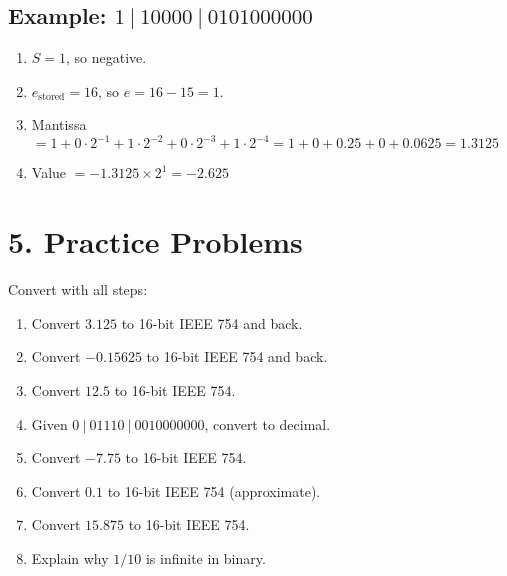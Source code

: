 \documentclass[12pt]{article}
\begin{document}
\subsection*{Example: $1\ |\ 10000\ |\ 0101000000$}
\begin{enumerate}
  \item $S=1$, so negative.
  \item $e_{\text{stored}} = 16$, so $e = 16 - 15 = 1$.
  \item Mantissa $= 1 + 0 \cdot 2^{-1} + 1 \cdot 2^{-2} + 0 \cdot 2^{-3} + 1 \cdot 2^{-4} = 1 + 0 + 0.25 + 0 + 0.0625 = 1.3125$
  \item Value $= -1.3125 \times 2^1 = -2.625$
\end{enumerate}

\section*{5. Practice Problems}
Convert with all steps:
\begin{enumerate}
  \item Convert $3.125$ to 16-bit IEEE 754 and back.
  \item Convert $-0.15625$ to 16-bit IEEE 754 and back.
  \item Convert $12.5$ to 16-bit IEEE 754.
  \item Given $0\ |\ 01110\ |\ 0010000000$, convert to decimal.
  \item Convert $-7.75$ to 16-bit IEEE 754.
  \item Convert $0.1$ to 16-bit IEEE 754 (approximate).
  \item Convert $15.875$ to 16-bit IEEE 754.
  \item Explain why $1/10$ is infinite in binary.
\end{enumerate}
\end{document}
